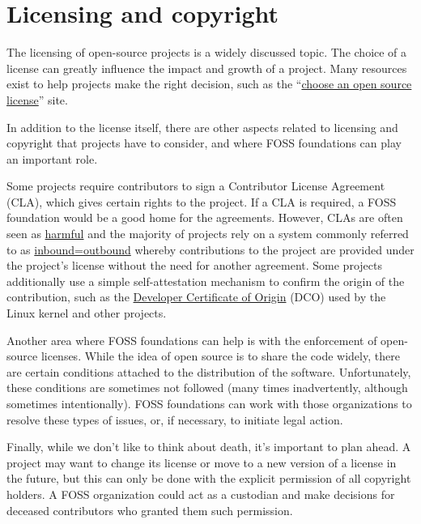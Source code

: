 


\chapter{Licensing and copyright}

The licensing of open-source projects is a widely discussed topic.  The choice of a license can greatly influence the impact and growth of a project.  Many resources exist to help projects make the right decision, such as the ``\href{https://choosealicense.com/}{choose an open source license}'' site.

In addition to the license itself, there are other aspects related to licensing and copyright that projects have to consider, and where FOSS foundations can play an important role.

Some projects require contributors to sign a Contributor License Agreement (CLA), which gives certain rights to the project.  If a CLA is required, a FOSS foundation would be a good home for the agreements.  However, CLAs are often seen as \href{https://opensource.com/article/19/2/cla-problems}{harmful} and the majority of projects rely on a system commonly referred to as \href{https://opensource.com/law/11/7/trouble-harmony-part-1}{inbound=outbound} whereby contributions to the project are provided under the project's license without the need for another agreement.  Some projects additionally use a simple self-attestation mechanism to confirm the origin of the contribution, such as the \href{https://developercertificate.org/}{Developer Certificate of Origin} (DCO) used by the Linux kernel and other projects.

Another area where FOSS foundations can help is with the enforcement of open-source licenses.  While the idea of open source is to share the code widely, there are certain conditions attached to the distribution of the software.  Unfortunately, these conditions are sometimes not followed (many times inadvertently, although sometimes intentionally).  FOSS foundations can work with those organizations to resolve these types of issues, or, if necessary, to initiate legal action.

Finally, while we don't like to think about death, it's important to plan ahead.  A project may want to change its license or move to a new version of a license in the future, but this can only be done with the explicit permission of all copyright holders.  A FOSS organization could act as a custodian and make decisions for deceased contributors who granted them such permission.

